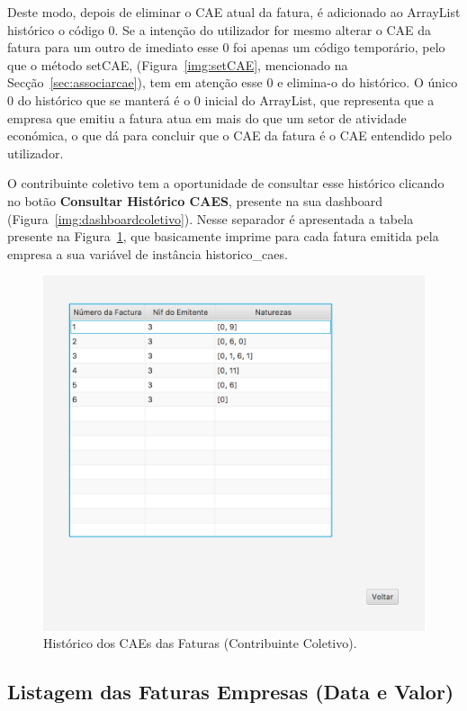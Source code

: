 \documentclass[a4paper]{article}
\begin{document}
\begin{itemize}
Deste modo, depois de eliminar o CAE atual da fatura, é adicionado ao ArrayList histórico o código 0.
Se a intenção do utilizador for mesmo alterar o CAE da fatura para um outro de imediato esse 0 foi
apenas um código temporário, pelo que o método \textsf{setCAE}, (Figura~\ref{img:setCAE},
mencionado na Secção~\ref{sec:associarcae}), tem em atenção esse 0
e elimina-o do histórico. O único 0 do histórico que se manterá é o 0 inicial do ArrayList,
que representa que a empresa que emitiu a fatura atua em mais do que um setor de atividade económica,
o que dá para concluir que o CAE da fatura é o CAE entendido pelo utilizador.

O contribuinte coletivo tem a oportunidade de consultar esse histórico clicando no botão
\textbf{Consultar Histórico CAES}, presente na sua dashboard (Figura~\ref{img:dashboardcoletivo}).
Nesse separador é apresentada a tabela presente na Figura~\ref{img:historicocaes}, que basicamente imprime
para cada fatura emitida pela empresa a sua variável de instância historico\_caes.

\begin{figure}[H]
\centering
\includegraphics[scale=0.35]{imgs/historicocaes.png}
\caption{Histórico dos CAEs das Faturas (Contribuinte Coletivo).}
\label{img:historicocaes}
\end{figure}



\subsection{Listagem das Faturas Empresas (Data e Valor)}
\label{sec:listagemfempresas}


\end{itemize}
\end{document}
